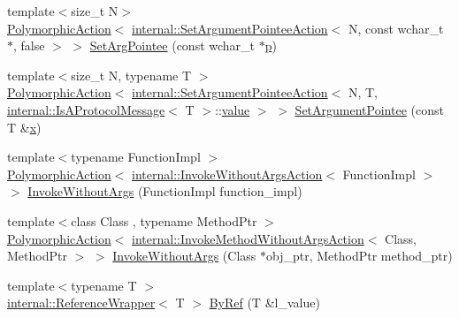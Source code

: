 \begin{DoxyCompactItemize}
\item 
{\footnotesize template$<$size\+\_\+t N$>$ }\\\mbox{\hyperlink{classtesting_1_1_polymorphic_action}{Polymorphic\+Action}}$<$ \mbox{\hyperlink{structtesting_1_1internal_1_1_set_argument_pointee_action}{internal\+::\+Set\+Argument\+Pointee\+Action}}$<$ N, const wchar\+\_\+t $\ast$, false $>$ $>$ \mbox{\hyperlink{namespacetesting_ac128085b4a8d64563fd5ccef324ea177}{Set\+Arg\+Pointee}} (const wchar\+\_\+t $\ast$\mbox{\hyperlink{_obj__test_2lib_2googletest-master_2googlemock_2test_2gmock-matchers__test_8cc_a6bc6b007533335efe02bafff799ec64c}{p}})
\item 
{\footnotesize template$<$size\+\_\+t N, typename T $>$ }\\\mbox{\hyperlink{classtesting_1_1_polymorphic_action}{Polymorphic\+Action}}$<$ \mbox{\hyperlink{structtesting_1_1internal_1_1_set_argument_pointee_action}{internal\+::\+Set\+Argument\+Pointee\+Action}}$<$ N, T, \mbox{\hyperlink{structtesting_1_1internal_1_1_is_a_protocol_message}{internal\+::\+Is\+A\+Protocol\+Message}}$<$ T $>$\+::\mbox{\hyperlink{_obj__test_2lib_2googletest-master_2googlemock_2test_2gmock-matchers__test_8cc_a337b8a670efc0b086ad3af163f3121b6}{value}} $>$ $>$ \mbox{\hyperlink{namespacetesting_a03b315d27c91a8e719f2b6c09964130b}{Set\+Argument\+Pointee}} (const T \&\mbox{\hyperlink{_obj__test_2lib_2googletest-master_2googlemock_2test_2gmock-matchers__test_8cc_a6150e0515f7202e2fb518f7206ed97dc}{x}})
\item 
{\footnotesize template$<$typename Function\+Impl $>$ }\\\mbox{\hyperlink{classtesting_1_1_polymorphic_action}{Polymorphic\+Action}}$<$ \mbox{\hyperlink{structtesting_1_1internal_1_1_invoke_without_args_action}{internal\+::\+Invoke\+Without\+Args\+Action}}$<$ Function\+Impl $>$ $>$ \mbox{\hyperlink{namespacetesting_a88cc1999296bc630f6a49cdf66bb21f9}{Invoke\+Without\+Args}} (Function\+Impl function\+\_\+impl)
\item 
{\footnotesize template$<$class Class , typename Method\+Ptr $>$ }\\\mbox{\hyperlink{classtesting_1_1_polymorphic_action}{Polymorphic\+Action}}$<$ \mbox{\hyperlink{structtesting_1_1internal_1_1_invoke_method_without_args_action}{internal\+::\+Invoke\+Method\+Without\+Args\+Action}}$<$ Class, Method\+Ptr $>$ $>$ \mbox{\hyperlink{namespacetesting_ab75325d71a8c37db94f349243815c728}{Invoke\+Without\+Args}} (Class $\ast$obj\+\_\+ptr, Method\+Ptr method\+\_\+ptr)
\item 
{\footnotesize template$<$typename T $>$ }\\\mbox{\hyperlink{classtesting_1_1internal_1_1_reference_wrapper}{internal\+::\+Reference\+Wrapper}}$<$ T $>$ \mbox{\hyperlink{namespacetesting_aaee6d42dcd69de6e7a1459c5c71222c3}{By\+Ref}} (T \&l\+\_\+value)

\end{DoxyCompactItemize}
